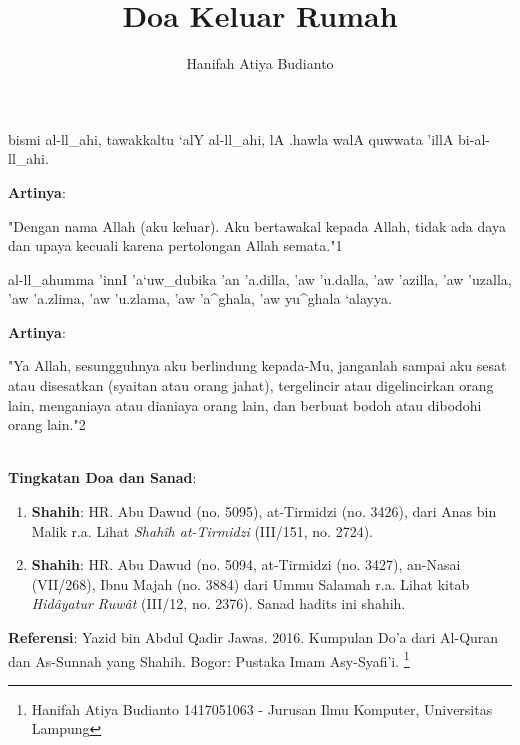 \documentclass[a4paper,12pt]{article}
\title{\Large Doa Keluar Rumah}
\author{\calligra Hanifah Atiya Budianto}
\begin{document}
\sffamily
\maketitle 
\fullvocalize
{}
\begin{arabtext}
\noindent
bismi al-ll_ahi, tawakkaltu `alY al-ll_ahi, lA .hawla walA quwwata 'illA 
bi-al-ll_ahi.\\
\end{arabtext}
\noindent
\textbf{Artinya}:
\par
\indent
"Dengan nama Allah (aku keluar). Aku bertawakal kepada Allah, tidak ada 
daya dan upaya kecuali karena pertolongan Allah semata."{\scriptsize 1}\\
\begin{arabtext}
\noindent
al-ll_ahumma 'innI 'a`uw_dubika 'an 'a.dilla, 'aw 'u.dalla, 'aw 'azilla, 
'aw 'uzalla, 'aw 'a.zlima, 'aw 'u.zlama, 'aw 'a^ghala, 'aw yu^ghala 
`alayya.\\
\end{arabtext}
\noindent
\textbf{Artinya}:
\par
\indent
"Ya Allah, sesungguhnya aku berlindung kepada-Mu, janganlah sampai aku 
sesat atau disesatkan (syaitan atau orang jahat), tergelincir atau 
digelincirkan orang lain, menganiaya atau dianiaya orang lain, dan berbuat 
bodoh atau dibodohi orang lain."{\scriptsize 2}\\\\
\par
\noindent
\textbf{Tingkatan Doa dan Sanad}:
\begin{enumerate}
\item \textbf{Shahih}: HR. Abu Dawud (no. 5095), at-Tirmidzi (no. 3426), 
dari Anas bin Malik r.a. Lihat \textit{Shah\^{i}h at-Tirmidzi} (III/151, 
no.  2724).
\item \textbf{Shahih}: HR. Abu Dawud (no. 5094, at-Tirmidzi (no. 3427), 
an-Nasai (VII/268), Ibnu Majah (no. 3884) dari Ummu Salamah r.a. Lihat 
kitab \textit{Hid\^{a}yatur Ruw\^{a}t} (III/12, no. 2376). Sanad hadits 
ini shahih.
\end{enumerate}
\textbf{Referensi}: Yazid bin Abdul Qadir Jawas. 2016. Kumpulan Do'a dari
Al-Quran dan As-Sunnah yang Shahih. Bogor: Pustaka Imam Asy-Syafi'i.
\footnote{Hanifah Atiya Budianto 1417051063 - Jurusan Ilmu Komputer,
Universitas Lampung}
\end{document}
